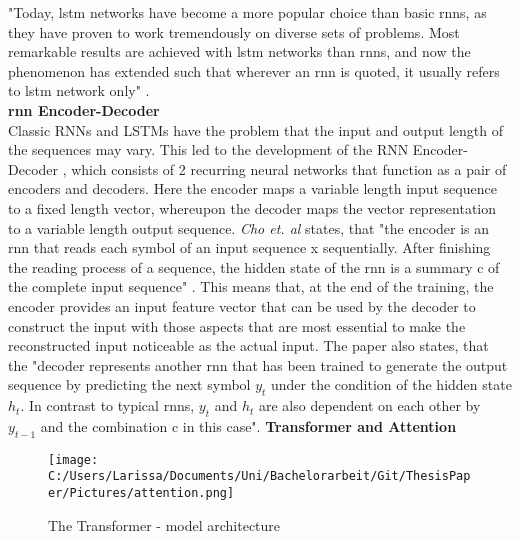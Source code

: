 \documentclass[a4paper, 11pt,titlepage,oneside,openany]{book}
\begin{document}
\noindent "Today, \gls{lstm} networks have become a more popular choice than basic \gls{rnn}s, as they have proven to work tremendously on diverse sets of problems. Most remarkable results are achieved with \gls{lstm} networks than \gls{rnn}s, and now the phenomenon has extended such that wherever an \gls{rnn} is quoted, it usually refers to \gls{lstm} network only" \cite{rnn}.\\

\noindent \textbf{\gls{rnn} Encoder-Decoder} \\
\noindent Classic RNNs and LSTMs have the problem that the input and output length of the sequences may vary. This led to the development of the RNN Encoder-Decoder \cite{encodedecode}, which consists of 2 recurring neural networks that function as a pair of encoders and decoders. Here the encoder maps a variable length input sequence to a fixed length vector, whereupon the decoder maps the vector representation to a variable length output sequence. \textit{Cho et. al} states, that "the encoder is an \gls{rnn} that reads each symbol of an input sequence x sequentially. After finishing the reading process of a sequence, the hidden state of the \gls{rnn} is a summary c of the complete input sequence" \cite{encodedecode}. This means that, at the end of the training, the encoder provides an input feature vector that can be used by the decoder to construct the input with those aspects that are most essential to make the reconstructed input noticeable as the actual input. The paper also states, that the "decoder represents another \gls{rnn} that has been trained to generate the output sequence by predicting the next symbol $y_t$ under the condition of the hidden state $h_t$. In contrast to typical \gls{rnn}s, $y_t$ and $h_t$ are also dependent on each other by $y_{t-1}$ and the combination c in this case". 
\newpage
\noindent \textbf{Transformer and Attention} \\
\begin{figure}[h]
	\centering
	\texttt{[image: C:/Users/Larissa/Documents/Uni/Bachelorarbeit/Git/ThesisPaper/Pictures/attention.png]}
	\caption{The Transformer - model architecture \cite{attention}}
\end{figure}\\
\end{document}
